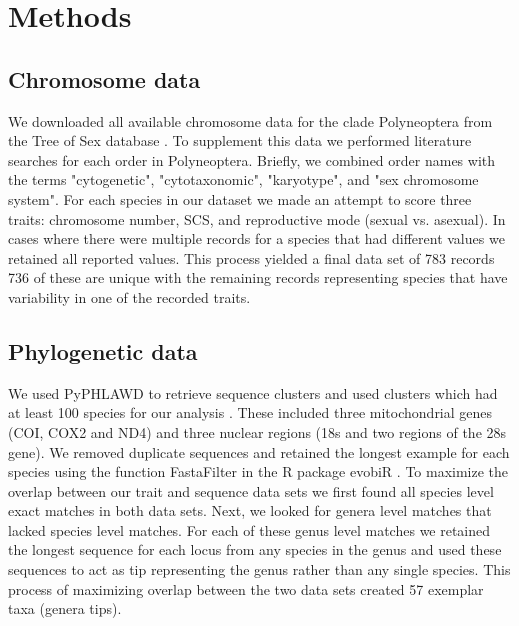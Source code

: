 \section{Methods}

\subsection{Chromosome data}
We downloaded all available chromosome data for the clade Polyneoptera from the Tree of Sex database \citep{blackmon2016,TOS2014}.
To supplement this data we performed literature searches for each order in Polyneoptera.
Briefly, we combined order names with the terms "cytogenetic", "cytotaxonomic", "karyotype", and "sex chromosome system". %
For each species in our dataset we made an attempt to score three traits: chromosome number, SCS, and reproductive mode (sexual vs. asexual).
In cases where there were multiple records for a species that had different values we retained all reported values.
This process yielded a final data set of 783 records 736 of these are unique with the remaining records representing species that have variability in one of the recorded traits. 

\subsection{Phylogenetic data}
We used PyPHLAWD to retrieve sequence clusters and used clusters which had at least 100 species for our analysis \citep{smith2018phyphlawd}. 
These included three mitochondrial genes (COI, COX2 and ND4) and three nuclear regions (18s and two regions of the 28s gene). 
We removed duplicate sequences and retained the longest example for each species using the function FastaFilter in the R package evobiR \citep{blackmon2015evobir}.
To maximize the overlap between our trait and sequence data sets we first found all species level exact matches in both data sets.
Next, we looked for genera level matches that lacked species level matches.
For each of these genus level matches we retained the longest sequence for each locus from any species in the genus and used these sequences to act as tip representing the genus rather than any single species. 
This process of maximizing overlap between the two data sets created 57 exemplar taxa (genera tips).

